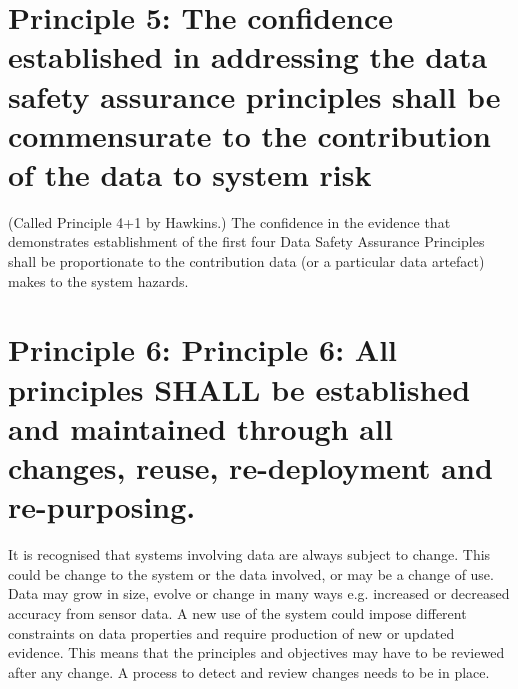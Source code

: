 \section{Principle 5: The confidence established in addressing the data safety assurance principles shall be commensurate to the contribution of the data to system risk}
(Called Principle 4+1 by Hawkins.) The confidence in the evidence that demonstrates establishment of the first four Data Safety Assurance Principles shall be proportionate to the contribution data (or a particular \gls{data artefact}) makes to the system hazards. 
\section{Principle 6: Principle 6: All principles SHALL be established and maintained through all changes, reuse, re-deployment and re-purposing.}
It is recognised that systems involving data are always subject to change. This could be change to the system or the data involved, or may be a change of use. Data may grow in size, evolve or change in many ways e.g. increased or decreased accuracy from sensor data.  A new use of the system could impose different constraints on data properties and require production of new or updated evidence. This means that the principles and objectives may have to be reviewed after any change. A process to detect and review changes needs to be in place.
